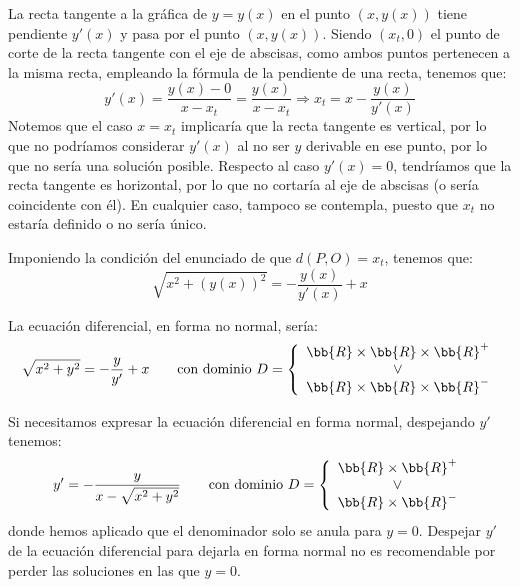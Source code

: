 \documentclass[12pt]{article}
\begin{document}
\begin{ejercicio}
        La recta tangente a la gráfica de $y=y(x)$ en el punto $(x,y(x))$ tiene pendiente $y'(x)$ y pasa por el punto $(x,y(x))$. Siendo $(x_t, 0)$ el punto de corte de la recta tangente con el eje de abscisas, como ambos puntos pertenecen a la misma recta, empleando la fórmula de la pendiente de una recta, tenemos que:
        \begin{equation*}
            y'(x) = \dfrac{y(x) - 0}{x - x_t} = \dfrac{y(x)}{x - x_t}
            \Longrightarrow
            x_t = x - \dfrac{y(x)}{y'(x)}
        \end{equation*}
        Notemos que el caso $x=x_t$ implicaría que la recta tangente es vertical, por lo que no podríamos considerar $y'(x)$ al no ser $y$ derivable en ese punto, por lo que no sería una solución posible.
        Respecto al caso $y'(x)=0$, tendríamos que la recta tangente es horizontal, por lo que no cortaría al eje de abscisas (o sería coincidente con él). En cualquier caso, tampoco se contempla, puesto que $x_t$ no estaría definido o no sería único.

        Imponiendo la condición del enunciado de que $d(P,O) = x_t$, tenemos que:
        \begin{equation*}
            \sqrt{x^2 + (y(x))^2} = -\dfrac{y(x)}{y'(x)} +x
        \end{equation*}

        La ecuación diferencial, en forma no normal, sería:
        \begin{equation*}
            \sqrt{x^2 + y^2} = -\dfrac{y}{y'} + x \qquad \text{con dominio } D=\left\{\begin{array}{c}
                \bb{R}\times \bb{R}\times \bb{R}^+\\
                \lor\\
                \bb{R}\times \bb{R}\times \bb{R}^-
            \end{array}
            \right.
        \end{equation*}

        Si necesitamos expresar la ecuación diferencial en forma normal, despejando $y'$ tenemos:
        \begin{equation*}
            y' = -\dfrac{y}{x - \sqrt{x^2 + y^2}}
            \qquad \text{con dominio } D=\left\{\begin{array}{c}
                \bb{R}\times \bb{R}^+\\
                \lor\\
                \bb{R}\times \bb{R}^-
            \end{array}
            \right.
        \end{equation*}
        donde hemos aplicado que el denominador solo se anula para $y=0$. Despejar $y'$ de la ecuación diferencial para dejarla en forma normal no es recomendable por perder las soluciones en las que $y=0$.
    \end{ejercicio}
\end{document}
